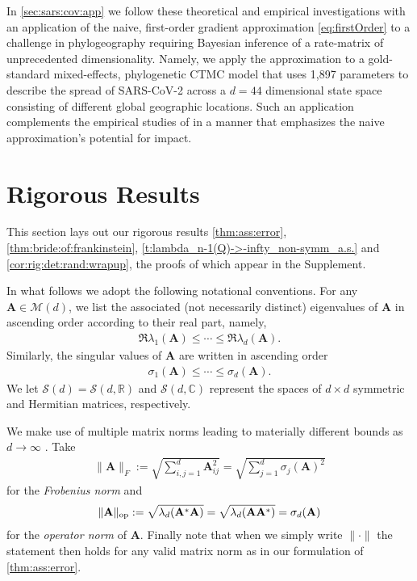 \documentclass[9pt,twocolumn,twoside]{pnas-new}
\newcommand{\bbR}{{\mathbb R}}
\newcommand{\bbC}{{\mathbb C}}
\newcommand{\?}{\textbf{?}}
\begin{document}
In \cref{sec:sars:cov:app} we follow these theoretical and empirical investigations
with an application of the naive, first-order gradient approximation
\eqref{eq:firstOrder} to a challenge in phylogeography requiring
Bayesian inference of a rate-matrix of unprecedented dimensionality.
Namely, we apply the approximation to a gold-standard mixed-effects,
phylogenetic CTMC model that uses 1,897 parameters to describe the
spread of SARS-CoV-2 across a $d=44$ dimensional state space
consisting of different global geographic locations.  Such an
application complements the empirical studies of
\cite{magee2023random} in a manner that emphasizes the naive
approximation's potential for impact.





\section{Rigorous Results}
\label{sec:rig:results}

This section lays out our rigorous results \cref{thm:ass:error},
\cref{thm:bride:of:frankinstein},
\cref{t:lambda_n-1(Q)->-infty_non-symm_a.s.} and
\cref{cor:rig:det:rand:wrapup}, the proofs of which appear in the
Supplement.

In what follows we adopt the following notational conventions. For any
${\mathbf A} \in {\mathcal M}(d)$, we list the associated (not
necessarily distinct) eigenvalues of $\mathbf{A}$ in ascending order
according to their real part, namely,
\begin{align}\label{eq:EV:real:ass}
  \Re \lambda_1({\mathbf A}) \leq \cdots \leq \Re \lambda_d({\mathbf A}).
\end{align}
Similarly, the singular values of ${\mathbf A}$ are written in
ascending order
\begin{align}\label{eq:SV:ass}
  \sigma_1({\mathbf A}) \leq \cdots \leq \sigma_d({\mathbf A}).
\end{align}
We let ${\mathcal S}(d) = {\mathcal S}(d,\bbR)$ and ${\mathcal S}(d,\bbC)$ represent the spaces of $d \times d$ symmetric and Hermitian matrices,
respectively.

We make use of multiple matrix norms leading to
materially different bounds as $d \rightarrow \infty$ \cite{trefethen2022numerical}.  Take
\begin{align}\label{eq:frob:norm}
  \|\mathbf{A}\|_{F} := \sqrt{\sum_{i,j =1}^d \mathbf{A}_{ij}^2} =
  \sqrt{\sum_{j =1}^d \sigma_j(\mathbf{A})^2}
\end{align}
for the \emph{Frobenius norm} and
\begin{align}\label{eq:op:norm}
  \|{\mathbf A}\|_{\textnormal{op}} :=  \sqrt{\lambda_d({\mathbf
  A}^*{\mathbf A})} = \sqrt{\lambda_d({\mathbf A}{\mathbf A}^*)}
  = \sigma_d(\mathbf{A})
\end{align}
for the \emph{operator norm} of ${\mathbf A}$.  Finally note that when we
simply write $\| \cdot \|$ the statement then holds for any valid
matrix norm as in our formulation of \cref{thm:ass:error}.
\end{document}
